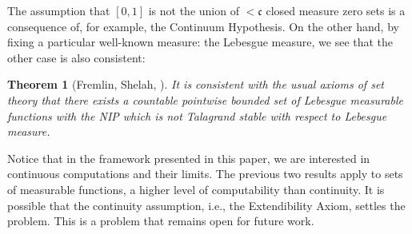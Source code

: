 \documentclass[psamsfonts]{amsart}
\newtheorem{thm}{Theorem}[section]
\theoremstyle{definition}
\theoremstyle{remark}
\numberwithin{equation}{section}
\begin{document}
The assumption that $[0,1]$ is not the union of $<\mathfrak{c}$ closed measure zero sets is a consequence of, for example, the Continuum Hypothesis.
On the other hand, by fixing a particular well-known measure: the Lebesgue measure, we see that the other case is also consistent:

\begin{thm}[Fremlin, Shelah, \cite{fremlin1993pointwise}]
    It is consistent with the usual axioms of set theory that there exists a countable pointwise bounded set of Lebesgue measurable functions with the NIP which is not Talagrand stable with respect to Lebesgue measure.
\end{thm}

Notice that in the framework presented in this paper, we are interested in continuous computations and their limits. 
The previous two results apply to sets of measurable functions, a higher level of computability than continuity.
It is possible that the continuity assumption, i.e., the Extendibility Axiom, settles the problem. 
This is a problem that remains open for future work.
\end{document}
